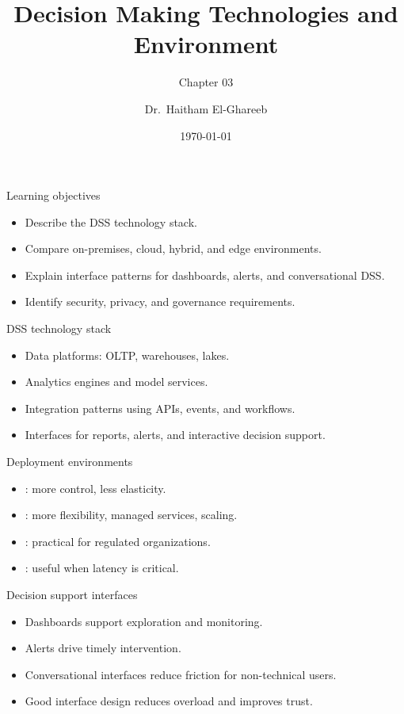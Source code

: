 \documentclass[aspectratio=169,11pt]{beamer}
\title[DSS Technology]{Decision Making Technologies and Environment}
\subtitle{Chapter 03}
\author{Dr.\ Haitham El-Ghareeb}
\institute{Faculty of Computers and Information Sciences}
\date{\today}
\begin{document}
\begin{frame}
  \titlepage
\end{frame}

\begin{frame}{Learning objectives}
  \begin{itemize}
    \item Describe the DSS technology stack.
    \item Compare on-premises, cloud, hybrid, and edge environments.
    \item Explain interface patterns for dashboards, alerts, and conversational
    DSS.
    \item Identify security, privacy, and governance requirements.
  \end{itemize}
\end{frame}

\begin{frame}{DSS technology stack}
  \begin{itemize}
    \item Data platforms: OLTP, warehouses, lakes.
    \item Analytics engines and model services.
    \item Integration patterns using APIs, events, and workflows.
    \item Interfaces for reports, alerts, and interactive decision support.
  \end{itemize}
\end{frame}

\begin{frame}{Deployment environments}
  \begin{itemize}
    \item {}: more control, less elasticity.
    \item {}: more flexibility, managed services, scaling.
    \item {}: practical for regulated organizations.
    \item {}: useful when latency is critical.
  \end{itemize}
\end{frame}

\begin{frame}{Decision support interfaces}
  \begin{itemize}
    \item Dashboards support exploration and monitoring.
    \item Alerts drive timely intervention.
    \item Conversational interfaces reduce friction for non-technical users.
    \item Good interface design reduces overload and improves trust.
  \end{itemize}
\end{frame}
\end{document}
